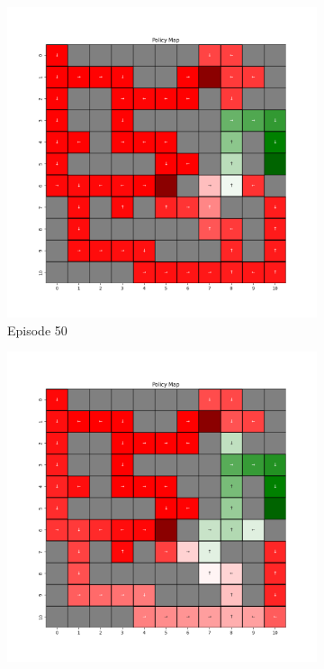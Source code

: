 \documentclass{assignment}
\begin{document}
\begin{figure}[H]
\begin{subfigure}{0.3\textwidth}
        \includegraphics[width=\textwidth]{figures/policy_q/alpha_sweep/policy_alpha_0.5_gamma_0.95_epsilon_0.2_iteration_50.png}
    \caption{Episode 50}
    \end{subfigure}\hfill
    \begin{subfigure}{0.3\textwidth}
        \includegraphics[width=\textwidth]{figures/policy_q/alpha_sweep/policy_alpha_0.5_gamma_0.95_epsilon_0.2_iteration_100.png}

\end{subfigure}
\end{figure}
\end{document}
